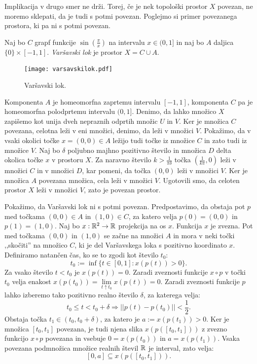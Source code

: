 \documentclass[../TG_magistrsko_delo_sections.tex]{subfiles}
\begin{document}
Implikacija v drugo smer ne drži. Torej, če je nek topološki prostor $X$ povezan, ne moremo sklepati, da je tudi s potmi povezan. Poglejmo si primer povezanega prostora, ki pa ni s potmi povezan.

\begin{definicija}
Naj bo $C$ grapf funkcije $\sin\left(\frac{\pi}{x}\right)$ na intervalu $x \in (0 , 1]$ in naj bo $A$ daljica $\{ 0 \} \times [-1 , 1]$. \emph{Varšavski lok} je prostor $X = C \cup A$.
\end{definicija}

\begin{figure}[h]
  \centering
  \texttt{[image: varsavskilok.pdf]}
  \caption[Primer vektorske slike.]{Varšavski lok.}
  \label{fig:varsavski_lok}
\end{figure}


Komponenta $A$ je homeomorfna zaprtemu intervalu $[-1, 1]$, komponenta $C$ pa je homeomorfna polodprtemu intervalu $(0, 1]$. Denimo, da lahko množico $X$ zapišemo kot unija dveh nepraznih odprtih množic $U$ in $V$. Ker je množica $C$ povezana, celotna leži v eni množici, denimo, da leži v množici $V$. Pokažimo, da v vsaki okolici točke $x = (0, 0) \in  A$ ležijo tudi točke iz množice $C$ in zato tudi iz množice $V$. Naj bo $\delta$ poljubno majhno pozitivno število in množica $D$ delta okolica točke $x$ v prostoru $X$. Za naravno število $k > \frac{1}{\pi \delta}$ točka $\left(\frac{1}{k \pi}, 0\right)$ leži v množici $C$ in v množici $D$, kar pomeni, da točka $(0, 0)$ leži v množici $V$. Ker je množica $A$ povezana množica, cela leži v množici $V$. Ugotovili smo, da celoten prostor $X$ leži v množici $V$, zato je povezan prostor.

Pokažimo, da Varšavski lok ni s potmi povezan. Predpostavimo, da obstaja pot $p$ med točkama $(0, 0) \in A$ in $(1, 0) \in C$, za katero velja $p(0) = (0, 0)$ in $p(1) = (1, 0)$. Naj bo $x: \mathbb R^2 \to \mathbb R$ projekcija na os $x$. Funkcija $x$ je zvezna. Pot med točkama $(0, 0)$ in $(1, 0)$ se začne na množici $A$ in mora v neki točki ,,skočiti'' na množico $C$, ki je del Varšavskega loka s pozitivno koordinato $x$.   
Definiramo natančen čas, ko se to zgodi kot število $t_0$:
$$t_0 := \inf\{t \in [0, 1]: x(p(t)) > 0 \}.$$
Za vsako število $t < t_0$ je $x(p(t)) = 0$. Zaradi zveznosti funkcije $x \circ p$ v točki $t_0$ velja enakost $x(p(t_0)) = \lim\limits_{t \uparrow t_0} x(p(t)) = 0$. Zaradi zveznosti funkcije $p$ lahko izberemo tako pozitivno realno število $\delta$, za katerega velja:
$$t_0 \leq t < t_0 + \delta \Rightarrow ||p(t) - p(t_0)|| < \frac{1}{2}.$$
Obstaja točka $t_1 \in (t_0, t_0 + \delta)$, za katero je $a := x(p(t_1)) >0$. Ker je množica $[t_0, t_1]$ povezana, je tudi njena slika $x(p([t_0, t_1]))$ z zvezno funkcijo $x \circ p$ povezana in vsebuje $0 = x(p(t_0))$ in $a = x(p(t_1))$. Vsaka povezana podmnožica množice realnih števil $\mathbb R$ je interval, zato velja:
$$[0, a] \subseteq x(p([t_0, t_1])).$$
\end{document}
